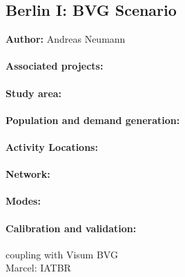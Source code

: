 \subsection{Berlin I: BVG Scenario}
\label{ch:scenarios:berlinI}
\hfill \textbf{Author:} Andreas Neumann

\citep[][p.67ff]{Balmer_PhDThesis_2007}

\citep[][Ch 7/8]{Neumann_PhDThesis_2014}

\paragraph{Associated projects:}

\paragraph{Study area:}

\paragraph{Population and demand generation:}

\paragraph{Activity Locations:}

\paragraph{Network:}

\paragraph{Modes:}

\paragraph{Calibration and validation:}


coupling with Visum BVG \\
Marcel: IATBR \\

